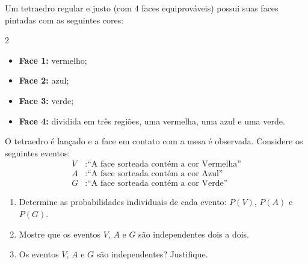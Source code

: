 %
%


\begin{exercicioBanco}[\valorquestao]
Um tetraedro regular e justo (com 4 faces equiprováveis) possui suas faces pintadas com as seguintes cores:
\begin{multicols}{2}
\begin{itemize}
    \item \textbf{Face 1:} vermelho;
    \item \textbf{Face 2:} azul;
    \item \textbf{Face 3:} verde;
    \item \textbf{Face 4:} dividida em três regiões, uma vermelha, uma azul e uma verde.
\end{itemize}
\end{multicols}

\noindent O tetraedro é lançado e a face em contato com a mesa é observada. Considere os seguintes eventos:
\begin{align*}
    V &: \text{``A face sorteada contém a cor Vermelha''} \\
    A &: \text{``A face sorteada contém a cor Azul''} \\
    G &: \text{``A face sorteada contém a cor Verde''}
\end{align*}

\begin{enumerate}
    \item[(a)] Determine as probabilidades individuais de cada evento: $P(V)$, $P(A)$ e $P(G)$.
    \item[(b)] Mostre que os eventos $V$, $A$ e $G$ são independentes dois a dois.
    \item[(c)] Os eventos $V$, $A$ e $G$ são independentes? Justifique.
\end{enumerate}
\end{exercicioBanco}

